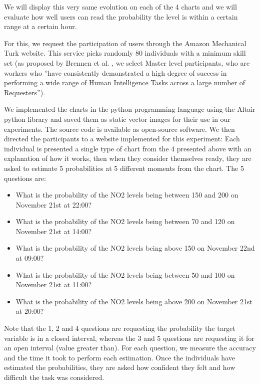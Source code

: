 \documentclass[a4paper,3p,sort&compress]{elsarticle}
\begin{document}
We will display this very same evolution on each of the 4 charts and we will evaluate how well users can 
read the probability the \no level is within a certain range at a certain hour. 

For this, we request the participation of users through the Amazon Mechanical Turk website. 
This service picks randomly 80 individuals with a minimum skill set (as proposed by Brennen 
et al. \cite{brennen_instrument_2018}, we select Master level participants, who are workers who 
''have consistently demonstrated a high degree of success in performing a wide range of Human Intelligence Tasks across a 
large number of Requesters'').

We implemented the charts in the python programming language using the Altair python library 
\cite{vanderplas2018altair} and saved them as static vector images for their use in our experiments. The source code is 
available as open-source software. We then directed the participants to a website implemented for this experiment: 
Each individual is presented a 
single type of chart from the 4 presented above with an explanation of how it works, 
then when they consider themselves ready, they are asked to estimate 5 probabilities at 5 different moments from the chart. 
The 5 questions are:
\begin{itemize}
  \item What is the probability of the NO2 levels being between 150 and 200 on November 21st at 22:00?
  \item What is the probability of the NO2 levels being between 70 and 120 on November 21st at 14:00?
  \item What is the probability of the NO2 levels being above 150 on November 22nd at 09:00?
  \item What is the probability of the NO2 levels being between 50 and 100 on November 21st at 11:00?
  \item What is the probability of the NO2 levels being above 200 on November 21st at 20:00?
\end{itemize}

Note that the 1, 2 and 4 questions are requesting the probability the target variable is in a closed interval, whereas
the 3 and 5 questions are requesting it for an open interval (value greater than). 
For each question, we measure the accuracy and the time it took to 
perform each estimation. Once the individuals have estimated the probabilities, they are asked how confident they 
felt and how difficult the task was considered.
\end{document}
